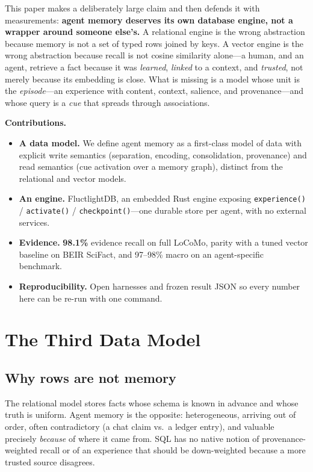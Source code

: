 \documentclass[11pt]{article}
\begin{document}
This paper makes a deliberately large claim and then defends it with measurements:
\textbf{agent memory deserves its own database engine, not a wrapper around someone
else's.} A relational engine is the wrong abstraction because memory is not a set
of typed rows joined by keys. A vector engine is the wrong abstraction because
recall is not cosine similarity alone---a human, and an agent, retrieve a fact
because it was \emph{learned}, \emph{linked} to a context, and \emph{trusted},
not merely because its embedding is close. What is missing is a model whose unit
is the \emph{episode}---an experience with content, context, salience, and
provenance---and whose query is a \emph{cue} that spreads through associations.

\textbf{Contributions.}
\begin{itemize}
  \item \textbf{A data model.} We define agent memory as a first-class model of
  data with explicit write semantics (separation, encoding, consolidation,
  provenance) and read semantics (cue activation over a memory graph), distinct
  from the relational and vector models.
  \item \textbf{An engine.} FluctlightDB, an embedded Rust engine exposing
  \texttt{experience()} / \texttt{activate()} / \texttt{checkpoint()}---one
  durable store per agent, with no external services.
  \item \textbf{Evidence.} \textbf{98.1\%} evidence recall on full LoCoMo,
  parity with a tuned vector baseline on BEIR SciFact, and 97--98\% macro on an
  agent-specific benchmark.
  \item \textbf{Reproducibility.} Open harnesses and frozen result JSON so every
  number here can be re-run with one command.
\end{itemize}

\section{The Third Data Model}
\subsection{Why rows are not memory}
The relational model stores facts whose schema is known in advance and whose
truth is uniform. Agent memory is the opposite: heterogeneous, arriving out of
order, often contradictory (a chat claim vs.\ a ledger entry), and valuable
precisely \emph{because} of where it came from. SQL has no native notion of
provenance-weighted recall or of an experience that should be down-weighted
because a more trusted source disagrees.
\end{document}
